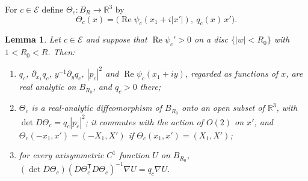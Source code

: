 \documentclass[11pt]{amsart}
\newtheorem{lemma}[theorem]{Lemma}
\theoremstyle{definition}
\theoremstyle{remark}
\numberwithin{equation}{section}
\newcommand{\R}{\mathbb{R}}
\DeclareMathOperator{\re}{Re}
\begin{document}
For $c\in\mathcal E$ define $\Theta_c\colon B_R\to\R^3$ by
\begin{equation}\label{r3:eq-Theta}
\Theta_c(x)=\big(\re\psi_c(x_1+i|x'|),\ q_c(x)\,x'\big).
\end{equation}

\begin{lemma}\label{r3:lem-lift}
Let $c\in\mathcal E$ and suppose that $\re\psi_c'>0$ on a disc $\{|w|<R_0\}$ with $1<R_0<R$. Then:
\begin{enumerate}[label=\textup{(\alph*)}]
\item $q_c$, $\partial_{x_1}q_c$, $y^{-1}\partial_yq_c$, $|p_c|^2$ and $\re\psi_c(x_1+iy)$, regarded as functions of $x$, are real analytic on $B_{R_0}$, and $q_c>0$ there;
\item $\Theta_c$ is a real-analytic diffeomorphism of $B_{R_0}$ onto an open subset of $\R^3$, with $\det D\Theta_c=q_c|p_c|^2$; it commutes with the action of $O(2)$ on $x'$, and $\Theta_c(-x_1,x')=(-X_1,X')$ if $\Theta_c(x_1,x')=(X_1,X')$;
\item for every axisymmetric $C^1$ function $U$ on $B_{R_0}$, $(\det D\Theta_c)(D\Theta_c^{\mathsf T}D\Theta_c)^{-1}\nabla U=q_c\nabla U$.
\end{enumerate}
\end{lemma}
\end{document}
